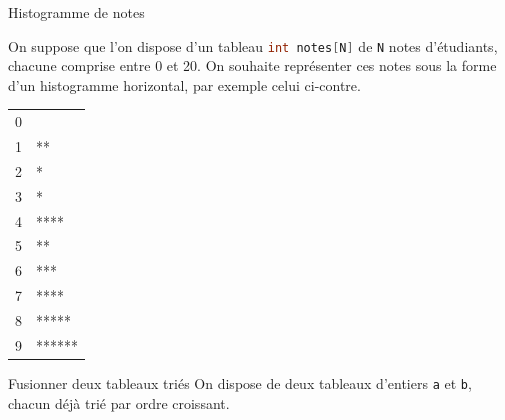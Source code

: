 \begin{UPSTIexercice}{Histogramme de notes}
    \begin{minipage}{.8\linewidth}
        On suppose que l'on dispose d'un tableau \lstinline[language=c]{int notes[N]} de \texttt{N} notes d'étudiants, chacune comprise entre 0 et 20.
        On souhaite représenter ces notes sous la forme d'un histogramme horizontal, par exemple celui ci-contre.
        
    \end{minipage}\hfill
    \begin{minipage}{.15\linewidth}
        \begin{tabular}{ll}
            0 &        \\
            1 & **     \\
            2 & *      \\
            3 & *      \\
            4 & ****   \\
            5 & **     \\
            6 & ***    \\
            7 & ****   \\
            8 & *****  \\
            9 & ****** \\
        \end{tabular}
    \end{minipage}
    
\end{UPSTIexercice}

\begin{UPSTIexercice}{Fusionner deux tableaux triés}
    On dispose de deux tableaux d'entiers \texttt{a} et \texttt{b}, chacun déjà trié par ordre croissant.

\end{UPSTIexercice}


